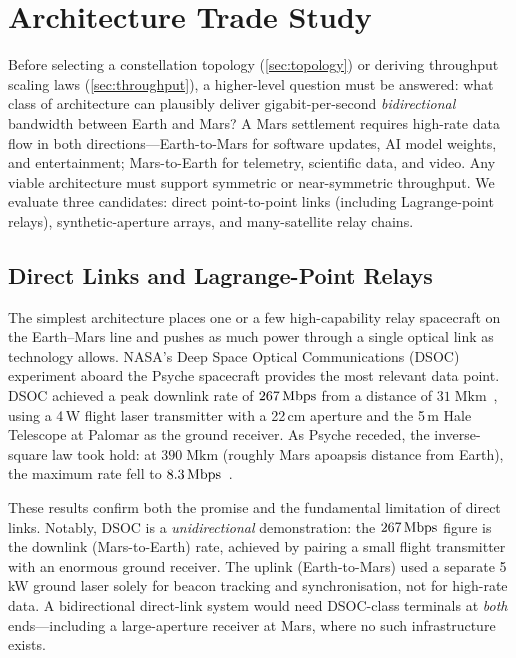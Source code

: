 \section{Architecture Trade Study}
\label{sec:architecture-trade}

Before selecting a constellation topology (\cref{sec:topology}) or deriving
throughput scaling laws (\cref{sec:throughput}), a higher-level question must be
answered: what class of architecture can plausibly deliver gigabit-per-second
\emph{bidirectional} bandwidth between Earth and Mars? A Mars settlement requires
high-rate data flow in both directions---Earth-to-Mars for software updates, AI
model weights, and entertainment; Mars-to-Earth for telemetry, scientific data,
and video. Any viable architecture must support symmetric or near-symmetric
throughput. We evaluate three candidates: direct point-to-point links (including
Lagrange-point relays), synthetic-aperture arrays, and many-satellite relay
chains.


\subsection{Direct Links and Lagrange-Point Relays}
\label{sec:direct-link}

The simplest architecture places one or a few high-capability relay spacecraft on
the Earth--Mars line and pushes as much power through a single optical link as
technology allows. NASA's Deep Space Optical Communications (DSOC) experiment
aboard the Psyche spacecraft provides the most relevant data point. DSOC
achieved a peak downlink rate of $267\,\text{Mbps}$ from a distance of
$31\;\text{Mkm}$~\cite{dsoc2024}, using a 4\,W flight laser transmitter with a
22\,cm aperture and the 5\,m Hale Telescope at Palomar as the ground receiver.
As Psyche receded, the inverse-square law took hold: at $390\;\text{Mkm}$
(roughly Mars apoapsis distance from Earth), the maximum rate fell to
$8.3\,\text{Mbps}$~\cite{dsoc2024}.

These results confirm both the promise and the fundamental limitation of direct
links. Notably, DSOC is a \emph{unidirectional} demonstration: the
$267\,\text{Mbps}$ figure is the downlink (Mars-to-Earth) rate, achieved by pairing a
small flight transmitter with an enormous ground receiver. The uplink
(Earth-to-Mars) used a separate 5\,kW ground laser solely for beacon tracking
and synchronisation, not for high-rate data. A bidirectional direct-link system
would need DSOC-class terminals at \emph{both} ends---including a large-aperture
receiver at Mars, where no such infrastructure exists.

